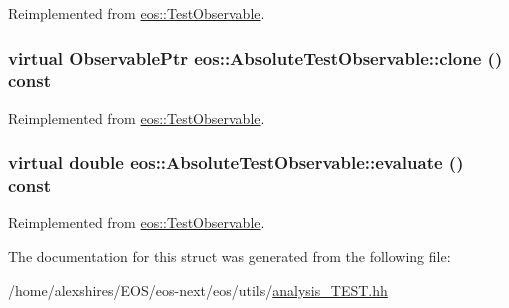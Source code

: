 Reimplemented from \hyperlink{structeos_1_1TestObservable_a40b0831f486d5a73e583becb0c6c9da4}{eos::TestObservable}.\hypertarget{structeos_1_1AbsoluteTestObservable_ac509cca6dca7383653b2d0e5c387db07}{
\subsubsection[{clone}]{\setlength{\rightskip}{0pt plus 5cm}virtual {\bf ObservablePtr} eos::AbsoluteTestObservable::clone () const}}
\label{structeos_1_1AbsoluteTestObservable_ac509cca6dca7383653b2d0e5c387db07}


Reimplemented from \hyperlink{structeos_1_1TestObservable_a2ec70cb32b39215b3c3eafd05a94e1f6}{eos::TestObservable}.\hypertarget{structeos_1_1AbsoluteTestObservable_a47742fbfae1d0d8b57c09ee2a7501376}{
\subsubsection[{evaluate}]{\setlength{\rightskip}{0pt plus 5cm}virtual double eos::AbsoluteTestObservable::evaluate () const}}
\label{structeos_1_1AbsoluteTestObservable_a47742fbfae1d0d8b57c09ee2a7501376}


Reimplemented from \hyperlink{structeos_1_1TestObservable_a05f143463bc9a2cddec1ee2bdb8d5ba2}{eos::TestObservable}.

The documentation for this struct was generated from the following file:\begin{DoxyCompactItemize}
\item 
/home/alexshires/EOS/eos-\/next/eos/utils/\hyperlink{analysis__TEST_8hh}{analysis\_\-TEST.hh}\end{DoxyCompactItemize}
